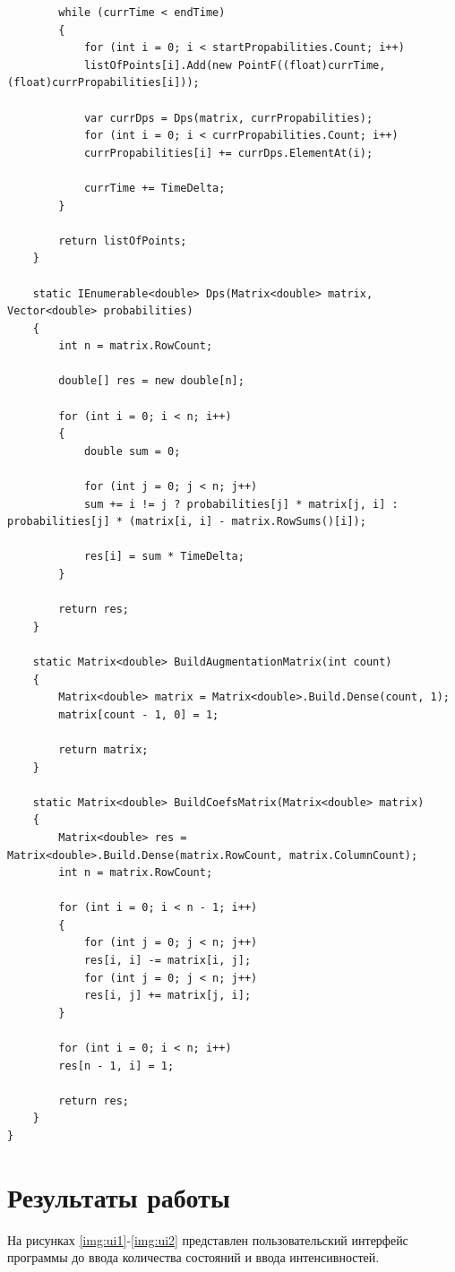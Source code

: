 \documentclass[12pt]{report}
\begin{document}
\begin{lstlisting}
		while (currTime < endTime)
		{
			for (int i = 0; i < startPropabilities.Count; i++)
			listOfPoints[i].Add(new PointF((float)currTime, (float)currPropabilities[i]));
			
			var currDps = Dps(matrix, currPropabilities);
			for (int i = 0; i < currPropabilities.Count; i++)
			currPropabilities[i] += currDps.ElementAt(i);
			
			currTime += TimeDelta;
		}
		
		return listOfPoints;
	}
	
	static IEnumerable<double> Dps(Matrix<double> matrix, Vector<double> probabilities)
	{
		int n = matrix.RowCount;
		
		double[] res = new double[n];
		
		for (int i = 0; i < n; i++)
		{
			double sum = 0;
			
			for (int j = 0; j < n; j++)
			sum += i != j ? probabilities[j] * matrix[j, i] : probabilities[j] * (matrix[i, i] - matrix.RowSums()[i]);
			
			res[i] = sum * TimeDelta;
		}
		
		return res;
	}
	
	static Matrix<double> BuildAugmentationMatrix(int count)
	{
		Matrix<double> matrix = Matrix<double>.Build.Dense(count, 1);
		matrix[count - 1, 0] = 1;
		
		return matrix;
	}
	
	static Matrix<double> BuildCoefsMatrix(Matrix<double> matrix)
	{
		Matrix<double> res = Matrix<double>.Build.Dense(matrix.RowCount, matrix.ColumnCount);
		int n = matrix.RowCount;
		
		for (int i = 0; i < n - 1; i++)
		{
			for (int j = 0; j < n; j++)
			res[i, i] -= matrix[i, j];
			for (int j = 0; j < n; j++)
			res[i, j] += matrix[j, i];
		}
		
		for (int i = 0; i < n; i++)
		res[n - 1, i] = 1;
		
		return res;
	}
}
\end{lstlisting}

\section{Результаты работы}

На рисунках \ref{img:ui1}-\ref{img:ui2} представлен пользовательский интерфейс программы до ввода количества состояний и ввода интенсивностей.
\end{document}

